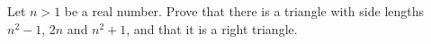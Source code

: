 Let $n>1$ be a real number. Prove that there is a triangle with side lengths $n^2-1$, $2n$ and $n^2+1$, and that it is a right triangle.

